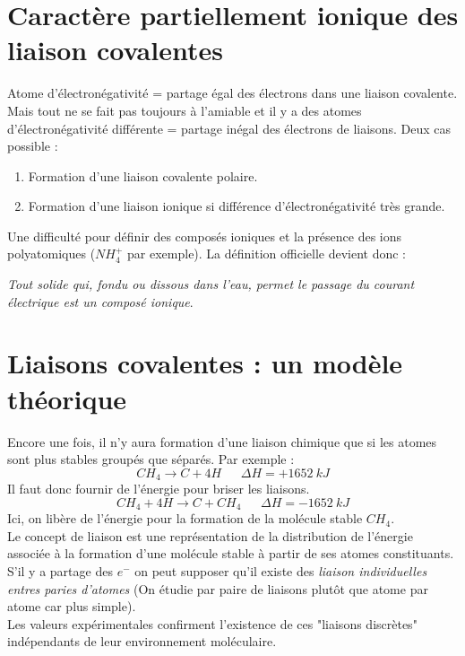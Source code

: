 \documentclass[british,french,11pt, a4paper, openany]{book}
\begin{document}
\section{Caractère partiellement ionique des liaison covalentes}
Atome d'électronégativité = partage égal des électrons dans une liaison covalente. Mais tout ne se fait pas toujours à l'amiable et il y a des atomes d'électronégativité différente = partage inégal des électrons de liaisons. Deux cas possible : 
\begin{enumerate}
	\item Formation d'une liaison covalente polaire.
	\item Formation d'une liaison ionique si différence d'électronégativité très grande.
\end{enumerate}
Une difficulté pour définir des composés ioniques et la présence des ions polyatomiques ($NH_4^+$ par exemple). La définition officielle devient donc : 
\begin{center}
	\textit{Tout solide qui, fondu ou dissous dans l'eau, permet le passage du courant électrique est un composé ionique}.
\end{center}

\section{Liaisons covalentes : un modèle théorique}
Encore une fois, il n'y aura formation d'une liaison chimique que si les atomes sont plus stables groupés que séparés. Par exemple : 
$$CH_4 \rightarrow C + 4H\ \ \ \ \ \ \ \Delta H = + 1652\ kJ$$
Il faut donc fournir de l'énergie pour briser les liaisons.
$$CH_4 + 4H \rightarrow C + CH_4\ \ \ \ \ \ \ \Delta H = - 1652\ kJ$$
Ici, on libère de l'énergie pour la formation de la molécule stable $CH_4$.\\

Le concept de liaison est une représentation de la distribution de l'énergie associée à la formation d'une molécule stable à partir de ses atomes constituants.\\
S'il y a partage des $e^-$ on peut supposer qu'il existe des \textit{liaison individuelles entres paries d'atomes} (On étudie par paire de liaisons plutôt que atome par atome car plus simple).\\

Les valeurs expérimentales confirment l'existence de ces "liaisons discrètes" indépendants de leur environnement moléculaire.
\end{document}
